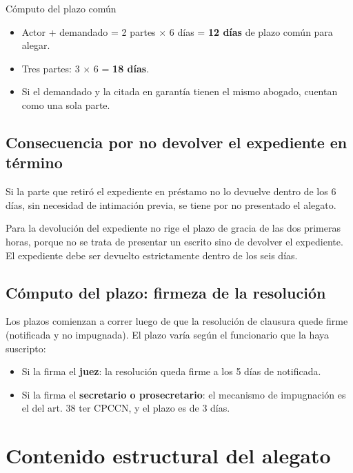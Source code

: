 \documentclass[12pt,oneside]{book}
\begin{document}
\begin{example}{Cómputo del plazo común}
\begin{itemize}
    \item Actor + demandado = 2 partes $\times$ 6 días = \textbf{12 días} de plazo común para alegar.
    \item Tres partes: 3 $\times$ 6 = \textbf{18 días}.
    \item Si el demandado y la citada en garantía tienen el mismo abogado, cuentan como una sola parte.
\end{itemize}
\end{example}

\subsection{Consecuencia por no devolver el expediente en término}

Si la parte que retiró el expediente en préstamo no lo devuelve dentro de los 6 días, sin necesidad de intimación previa, se tiene por no presentado el alegato.

\begin{important}
Para la devolución del expediente no rige el plazo de gracia de las dos primeras horas, porque no se trata de presentar un escrito sino de devolver el expediente. El expediente debe ser devuelto estrictamente dentro de los seis días.
\end{important}

\subsection{Cómputo del plazo: firmeza de la resolución}

Los plazos comienzan a correr luego de que la resolución de clausura quede firme (notificada y no impugnada). El plazo varía según el funcionario que la haya suscripto:

\begin{itemize}
    \item Si la firma el \textbf{juez}: la resolución queda firme a los 5 días de notificada.
    \item Si la firma el \textbf{secretario o prosecretario}: el mecanismo de impugnación es el del art. 38 ter CPCCN, y el plazo es de 3 días.
\end{itemize}

\section{Contenido estructural del alegato}
\end{document}
